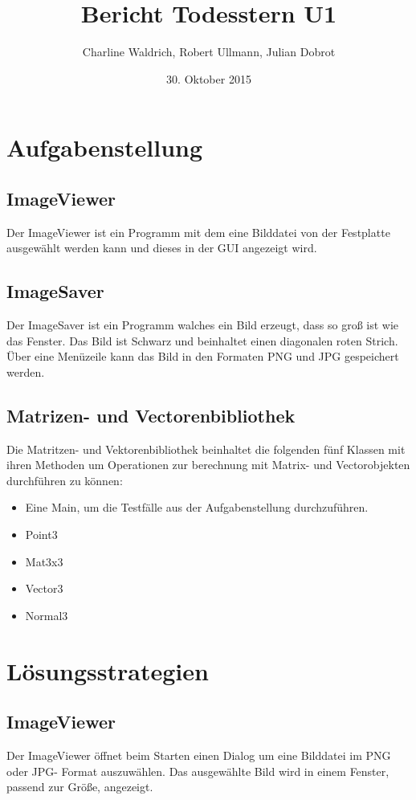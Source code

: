 \documentclass[14pt]{extarticle}
\title{Bericht Todesstern U1}
\author{Charline Waldrich, Robert Ullmann, Julian Dobrot}
\date{30. Oktober 2015}
\begin{document}
\maketitle
\pagebreak
\tableofcontents


\section{Aufgabenstellung}

\subsection{ImageViewer}
Der ImageViewer ist ein Programm mit dem eine Bilddatei von der Festplatte ausgewählt werden kann und dieses in der GUI angezeigt wird. 
\subsection{ImageSaver}
Der ImageSaver ist ein Programm walches ein Bild erzeugt, dass so groß ist wie das Fenster.
Das Bild ist Schwarz und beinhaltet einen diagonalen roten Strich. Über eine Menüzeile kann das Bild in den Formaten PNG und JPG gespeichert werden.
\subsection{Matrizen- und Vectorenbibliothek}
Die Matritzen- und Vektorenbibliothek beinhaltet die folgenden fünf Klassen mit ihren Methoden um Operationen 
zur berechnung mit Matrix- und Vectorobjekten durchführen zu können:

\begin{itemize}
\item Eine Main, um die Testfälle aus der Aufgabenstellung durchzuführen.
\item Point3
\item Mat3x3
\item Vector3 
\item Normal3
\end{itemize}


\section{Lösungsstrategien}
\subsection{ImageViewer}
Der ImageViewer öffnet beim Starten einen Dialog um eine Bilddatei im PNG oder JPG- Format auszuwählen. Das ausgewählte Bild wird in einem Fenster, passend zur Größe, angezeigt.
\end{document}
